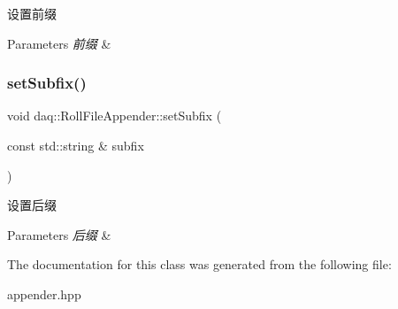 设置前缀 


\begin{DoxyParams}{Parameters}
{\em 前缀} & \\
\hline
\end{DoxyParams}
\mbox{\label{classdaq_1_1RollFileAppender_a18c120a62efcc2e5924b7a6450171607}} 
\subsubsection{\texorpdfstring{set\+Subfix()}{setSubfix()}}
{\footnotesize\ttfamily void daq\+::\+Roll\+File\+Appender\+::set\+Subfix (\begin{DoxyParamCaption}\item[{const std\+::string \&}]{subfix }\end{DoxyParamCaption})\hspace{0.3cm}{\ttfamily [inline]}}



设置后缀 


\begin{DoxyParams}{Parameters}
{\em 后缀} & \\
\hline
\end{DoxyParams}


The documentation for this class was generated from the following file\+:\begin{DoxyCompactItemize}
\item 
appender.\+hpp\end{DoxyCompactItemize}
